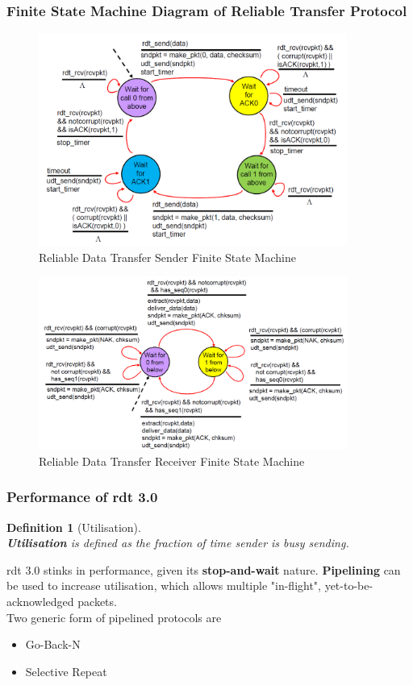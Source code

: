 \documentclass[12pt]{article}
\newtheorem{definition}{Definition}[section]
\theoremstyle{definition}
\begin{document}
\subsubsection{Finite State Machine Diagram of Reliable Transfer Protocol}
\begin{figure}[h]
\centering
\includegraphics[width = 0.9\textwidth]{4_3_1.png}
\caption{Reliable Data Transfer Sender Finite State Machine}
\end{figure}
\begin{figure}[h]
\centering
\includegraphics[width = 0.9\textwidth]{4_3_2.png}
\caption{Reliable Data Transfer Receiver Finite State Machine}
\end{figure}
\clearpage
\subsubsection{Performance of rdt 3.0}
\begin{definition}[Utilisation]
\hfill\\\normalfont \textbf{Utilisation} is defined as the fraction of time sender is busy sending.
\end{definition}
rdt 3.0 stinks in performance, given its \textbf{stop-and-wait} nature. \textbf{Pipelining} can be used to increase utilisation, which allows multiple "in-flight", yet-to-be-acknowledged packets.\\Two generic form of pipelined protocols are
\begin{itemize}
\item Go-Back-N
\item Selective Repeat
\end{itemize}
\end{document}
